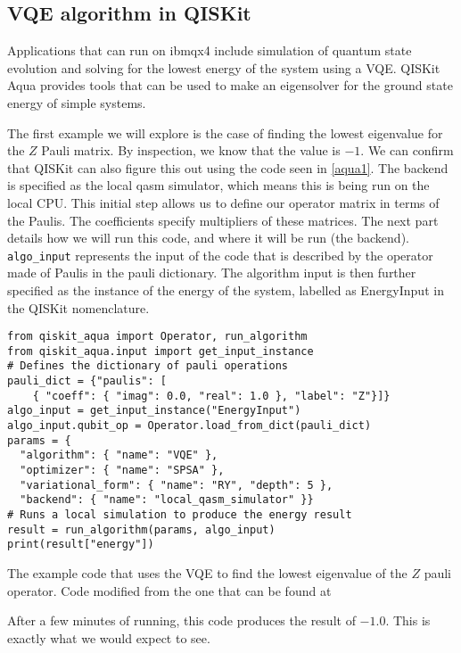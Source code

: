 \subsection{VQE algorithm in QISKit} %
Applications that can run on ibmqx4 include simulation of quantum state evolution and solving for the lowest energy of the system using a VQE. QISKit Aqua provides tools that can be used to make an eigensolver for the ground state energy of simple systems.

The first example we will explore is the case of finding the lowest eigenvalue for the $Z$ Pauli matrix. By inspection, we know that the value is $-1$. We can confirm that QISKit can also figure this out using the code seen in \autoref{aqua1}. The backend is specified as the local qasm simulator, which means this is being run on the local CPU. This initial step allows us to define our operator matrix in terms of the Paulis. The coefficients specify multipliers of these matrices. The next part details how we will run this code, and where it will be run (the backend). \texttt{algo\_input} represents the input of the code that is described by the operator made of Paulis in the pauli dictionary. The algorithm input is then further specified as the instance of the energy of the system, labelled as EnergyInput in the QISKit nomenclature. 

\begin{listing}[H]
\begin{verbatim}
from qiskit_aqua import Operator, run_algorithm
from qiskit_aqua.input import get_input_instance
# Defines the dictionary of pauli operations
pauli_dict = {"paulis": [
    { "coeff": { "imag": 0.0, "real": 1.0 }, "label": "Z"}]}
algo_input = get_input_instance("EnergyInput")
algo_input.qubit_op = Operator.load_from_dict(pauli_dict)
params = {
  "algorithm": { "name": "VQE" },
  "optimizer": { "name": "SPSA" },
  "variational_form": { "name": "RY", "depth": 5 },
  "backend": { "name": "local_qasm_simulator" }}
# Runs a local simulation to produce the energy result
result = run_algorithm(params, algo_input)
print(result["energy"])
\end{verbatim}
\caption{The example code that uses the VQE to find the lowest eigenvalue of the $Z$ pauli operator. Code modified from the one that can be found at \cite{QISKitAqua}}
\label{aqua1}
\end{listing}

After a few minutes of running, this code produces the result of $-1.0$. This is exactly what we would expect to see.

